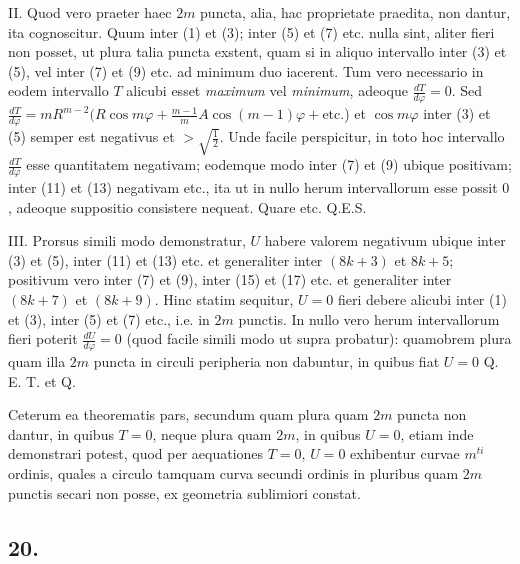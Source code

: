 \documentclass[14pt]{memoir}
\theoremstyle{plain}
\theoremstyle{remark}
\begin{document}
II. Quod vero praeter haec \(2m\) puncta, alia, hac proprietate praedita, non dantur, ita cognoscitur. Quum inter (1) et (3); inter (5) et (7) etc. nulla sint, aliter fieri non posset, ut plura talia puncta exstent, quam si in aliquo intervallo inter (3) et (5), vel inter (7) et (9) etc. ad minimum duo iacerent. Tum vero necessario in eodem intervallo \(T\) alicubi esset \textit{maximum} vel \textit{minimum}, adeoque \(\frac{dT}{d\varphi} = 0\). Sed \(\frac{dT}{d\varphi} = mR^{m-2}(R\cos m \varphi + \frac{m-1}{m} A \cos(m-1)\varphi + \text{etc.}\)) et \(\cos m\varphi \) inter (3) et (5) semper est negativus et \(>\surd{\tfrac{1}{2}}\). Unde facile perspicitur, in toto hoc intervallo \(\frac{dT}{d\varphi}\) esse quantitatem negativam; eodemque modo inter (7) et (9) ubique positivam; inter (11) et (13) negativam etc., ita ut in nullo herum intervallorum esse possit \(0\), adeoque suppositio consistere nequeat.  Quare etc. Q.E.S.

III. Prorsus simili modo demonstratur, \(U\) habere valorem negativum ubique inter (3) et (5), inter (11) et (13) etc. et generaliter inter \((8k+3)\) et \(8k+5\); positivum vero inter (7) et (9), inter (15) et (17) etc. et generaliter inter \( (8k+7)\) et \((8k+9)\). Hinc statim sequitur, \(U=0\) fieri debere alicubi inter (1) et (3), inter (5) et (7) etc., i.e. in \(2m\) punctis. In nullo vero herum intervallorum fieri poterit \(\frac{dU}{d\varphi}=0\) (quod facile simili modo ut supra probatur): quamobrem plura quam illa \(2m\) puncta in circuli peripheria non dabuntur, in quibus fiat \(U=0\) Q. E. T. et Q.

Ceterum ea theorematis pars, secundum quam plura quam \(2m\) puncta non dantur, in quibus \(T=0\), neque plura quam \(2m\), in quibus \(U = 0\), etiam inde demonstrari potest, quod per aequationes \(T = 0\), \(U=0\) exhibentur curvae \(m^{ti}\) ordinis, quales a circulo tamquam curva secundi ordinis in pluribus quam \(2m\) punctis secari non posse, ex geometria sublimiori constat.

\subsection*{20.}
\end{document}
